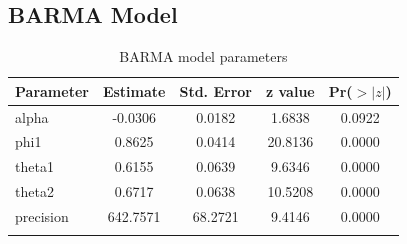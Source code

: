 \documentclass[12pt,a4paper,twoside]{article}
\begin{document}
\subsection{BARMA Model}
\label{ssec:BARMA}
\begin{longtable}{lcccc}
    \caption{BARMA model parameters}\\
    \hline
    \textbf{Parameter} & \textbf{Estimate} & \textbf{Std. Error} & \textbf{z value} & \textbf{Pr($>|z|$)} \\
    \hline
    alpha              & -0.0306           & 0.0182              & 1.6838           & 0.0922              \\
    phi1               & 0.8625            & 0.0414              & 20.8136          & 0.0000              \\
    theta1             & 0.6155            & 0.0639              & 9.6346           & 0.0000              \\
    theta2             & 0.6717            & 0.0638              & 10.5208          & 0.0000              \\
    precision          & 642.7571          & 68.2721             & 9.4146           & 0.0000              \\
    \hline
    \label{tab:BARMAparamstab}
\end{longtable}
\end{document}
